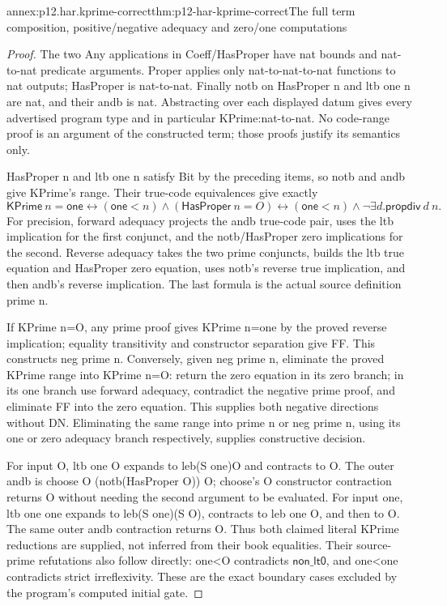 \begin{annexitem}{annex:p12.har.kprime-correct}{thm:p12-har-kprime-correct}{The full term composition, positive/negative adequacy and zero/one computations}
\begin{proof}
The two Any applications in Coeff/HasProper have nat bounds and
nat-to-nat predicate arguments. Proper applies only nat-to-nat-to-nat
functions to nat outputs; HasProper is nat-to-nat. Finally notb on
HasProper n and ltb one n are nat, and their andb is nat. Abstracting
over each displayed datum gives every advertised program type and in
particular KPrime:nat-to-nat. No code-range proof is an argument of
the constructed term; those proofs justify its semantics only.

HasProper n and ltb one n satisfy Bit by the preceding items, so notb
and andb give KPrime's range. Their true-code equivalences give exactly
\[
 \mathsf{KPrime}\ n=\mathsf{one}
 \leftrightarrow
 (\mathsf{one}<n)\wedge(\mathsf{HasProper}\ n=O)
 \leftrightarrow
 (\mathsf{one}<n)\wedge\neg\exists d.\mathsf{propdiv}\ d\ n.
\]
For precision, forward adequacy projects the andb true-code pair,
uses the ltb implication for the first conjunct, and the notb/HasProper
zero implications for the second. Reverse adequacy takes the two prime
conjuncts, builds the ltb true equation and HasProper zero equation,
uses notb's reverse true implication, and then andb's reverse implication.
The last formula is the actual source definition prime n.

If KPrime n=O, any prime proof gives KPrime n=one by the proved
reverse implication; equality transitivity and constructor separation
give FF. This constructs neg prime n. Conversely, given neg prime n,
eliminate the proved KPrime range into KPrime n=O: return the zero
equation in its zero branch; in its one branch use forward adequacy,
contradict the negative prime proof, and eliminate FF into the zero
equation. This supplies both negative directions without DN.
Eliminating the same range into prime n or neg prime n, using its
one or zero adequacy branch respectively, supplies constructive decision.

For input O, ltb one O expands to leb(S one)O and contracts to O.
The outer andb is choose O (notb(HasProper O)) O; choose's O
constructor contraction returns O without needing the second argument
to be evaluated. For input one, ltb one one expands to
leb(S one)(S O), contracts to leb one O, and then to O. The
same outer andb contraction returns O. Thus both claimed literal
KPrime reductions are supplied, not inferred from their book equalities.
Their source-prime refutations also follow directly: one<O contradicts
\(\mathsf{non\_lt0}\), and one<one contradicts strict irreflexivity. These are the
exact boundary cases excluded by the program's computed initial gate.


\end{proof}
\end{annexitem}
